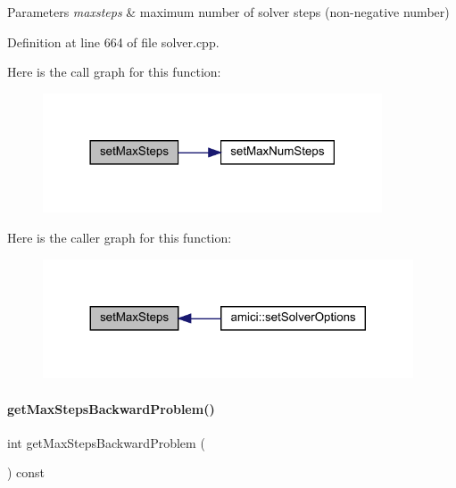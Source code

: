 \begin{DoxyParams}{Parameters}
{\em maxsteps} & maximum number of solver steps (non-\/negative number) \\
\hline
\end{DoxyParams}


Definition at line 664 of file solver.\+cpp.

Here is the call graph for this function\+:
\nopagebreak
\begin{figure}[H]
\begin{center}
\leavevmode
\includegraphics[width=285pt]{classamici_1_1_solver_ab321627a9f9d22013638e0eb9b14d2dc_cgraph}
\end{center}
\end{figure}
Here is the caller graph for this function\+:
\nopagebreak
\begin{figure}[H]
\begin{center}
\leavevmode
\includegraphics[width=311pt]{classamici_1_1_solver_ab321627a9f9d22013638e0eb9b14d2dc_icgraph}
\end{center}
\end{figure}
\mbox{\label{classamici_1_1_solver_a8f683e8adf7b34cab6dff296b1d38c83}} 
\paragraph{\texorpdfstring{get\+Max\+Steps\+Backward\+Problem()}{getMaxStepsBackwardProblem()}}
{\footnotesize\ttfamily int get\+Max\+Steps\+Backward\+Problem (\begin{DoxyParamCaption}{ }\end{DoxyParamCaption}) const}

